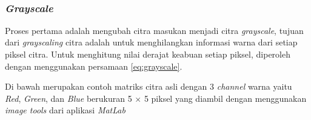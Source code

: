 \begin{adjustbox}{width=1\textwidth}
	\noindent\begin{minipage}{\linewidth}
		\label{fig:SkemaAlurPendeteksianPlat}
	\end{minipage}
\end{adjustbox}\\

\subsubsection{\textit{Grayscale}}
\noindent Proses pertama adalah mengubah citra masukan menjadi citra \textit{grayscale}, tujuan dari \textit{grayscaling} citra adalah untuk menghilangkan informasi warna dari setiap piksel citra. Untuk menghitung nilai derajat keabuan setiap piksel, diperoleh dengan menggunakan persamaan \ref{eq:grayscale}.

\noindent Di bawah merupakan contoh matriks citra asli dengan 3 \textit{channel} warna yaitu \textit{Red}, \textit{Green}, dan \textit{Blue} berukuran 5 $\times$ 5 piksel yang diambil dengan menggunakan \textit{image tools} dari aplikasi \textit{MatLab} \\

